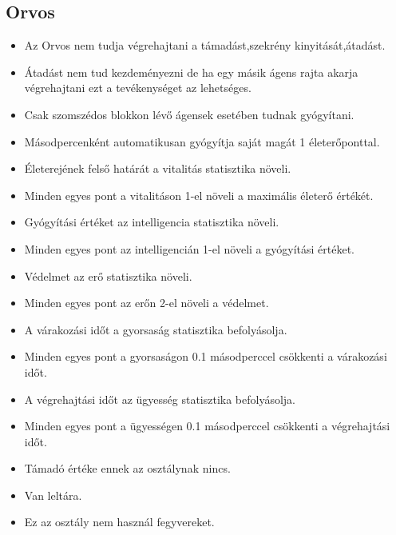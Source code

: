 \subsection{Orvos}
\begin{itemize}
\item Az Orvos nem tudja végrehajtani a támadást,szekrény kinyitását,átadást.
\item Átadást nem tud kezdeményezni de ha egy másik ágens rajta akarja végrehajtani ezt a tevékenységet az lehetséges.
\item Csak szomszédos blokkon lévő ágensek esetében tudnak gyógyítani.
\item Másodpercenként automatikusan gyógyítja saját magát 1 életerőponttal.
\item Életerejének felső határát a vitalitás statisztika növeli.
\item Minden egyes pont a vitalitáson 1-el növeli a maximális életerő értékét.
\item Gyógyítási értéket az intelligencia statisztika növeli.
\item Minden egyes pont az intelligencián 1-el növeli a gyógyítási értéket.
\item Védelmet az erő statisztika növeli.
\item Minden egyes pont az erőn 2-el növeli a védelmet.
\item A várakozási időt a gyorsaság statisztika befolyásolja.
\item Minden egyes pont a gyorsaságon 0.1 másodperccel csökkenti a várakozási időt.
\item A végrehajtási időt az ügyesség statisztika befolyásolja.
\item Minden egyes pont a ügyességen 0.1 másodperccel csökkenti a végrehajtási időt.
\item Támadó értéke ennek az osztálynak nincs.
\item Van leltára.
\item Ez az osztály nem használ fegyvereket.
\end{itemize}

